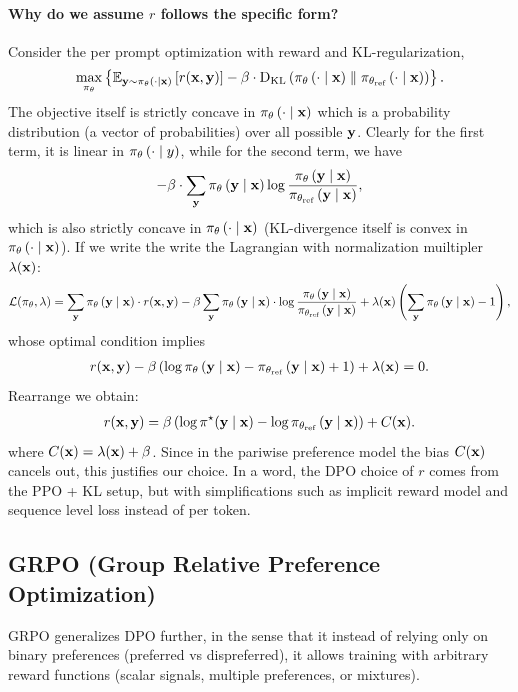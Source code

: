 \documentclass[11pt]{article}  %
\begin{document}
\paragraph{Why do we assume $r$ follows the specific form?}
Consider the per prompt optimization with reward and KL-regularization, 
\begin{align*}
  \max_{\pi_{\theta}} \left\{ \mathbb{E}_{\mathbf{y} \sim \pi_{\theta}\left( \cdot \mid \mathbf{x} \right)}\left[r(\mathbf{x}, \mathbf{y})\right] - \beta\cdot{\rm D}_{\text{KL}}\left( \pi_{\theta}\left( \cdot \mid \mathbf{x} \right) \parallel \pi_{\theta_{\text{ref}}}\left( \cdot \mid \mathbf{x} \right) \right) \right\}.
\end{align*}
The objective itself is strictly concave in $\pi_{\theta}\left( \cdot \mid \mathbf{x} \right)$ which is a probability distribution (a vector of probabilities) over all possible $\mathbf{y}$.
Clearly for the first term, it is linear in $\pi_{\theta}\left( \cdot \mid y \right)$, while for the second term, we have 
\begin{align*}
  -\beta\cdot\sum_{\mathbf{y}}\pi_{\theta}\left( \mathbf{y} \mid \mathbf{x} \right)\log\frac{\pi_{\theta}\left( \mathbf{y} \mid \mathbf{x} \right)}{\pi_{\theta_{\text{ref}}}\left( \mathbf{y} \mid \mathbf{x} \right)},
\end{align*} 
which is also strictly concave in $\pi_{\theta}\left( \cdot \mid \mathbf{x} \right)$ (KL-divergence itself is convex in $\pi_{\theta}\left( \cdot \mid \mathbf{x} \right)$).
If we write the write the Lagrangian with normalization muiltipler $\lambda(\mathbf{x})$:
\begin{align*}
  \mathcal{L}(\pi_\theta, \lambda) = \sum_{\mathbf{y}}\pi_{\theta}\left( \mathbf{y} \mid \mathbf{x} \right)\cdot r(\mathbf{x}, \mathbf{y})  - \beta \sum_{\mathbf{y}}\pi_{\theta}\left( \mathbf{y} \mid \mathbf{x} \right)\cdot\log \frac{\pi_{\theta}\left( \mathbf{y} \mid \mathbf{x} \right)}{\pi_{\theta_{\text{ref}}}\left( \mathbf{y} \mid \mathbf{x} \right)} + \lambda(\mathbf{x}) \left( \sum_{\mathbf{y}}\pi_{\theta}\left( \mathbf{y} \mid \mathbf{x} \right) - 1 \right),
\end{align*}
whose optimal condition implies 
\begin{align*}
  r(\mathbf{x}, \mathbf{y}) - \beta\left( \log \pi_{\theta}\left( \mathbf{y} \mid \mathbf{x} \right) - \pi_{\theta_{\text{ref}}}\left( \mathbf{y} \mid \mathbf{x} \right) + 1 \right) + \lambda(\mathbf{x}) = 0.
\end{align*}
Rearrange we obtain: 
\begin{align*}
  r(\mathbf{x}, \mathbf{y}) = \beta\left( \log\pi^\star(\mathbf{y}\mid\mathbf{x}) - \log\pi_{\theta_{\text{ref}}}\left( \mathbf{y} \mid \mathbf{x} \right) \right) + C(\mathbf{x}).
\end{align*}
where $C(\mathbf{x}) = \lambda(\mathbf{x}) + \beta$.
Since in the pariwise preference model the bias $C(\mathbf{x})$ cancels out, this justifies our choice. 
In a word, the DPO choice of $r$ comes from the PPO + KL setup, but with simplifications such as implicit reward model and sequence level loss instead of per token.


\subsection{GRPO (Group Relative Preference Optimization)}
GRPO generalizes DPO further, in the sense that it instead of relying only on binary preferences (preferred vs dispreferred), it allows training with arbitrary reward functions (scalar signals, multiple preferences, or mixtures).
\end{document}

